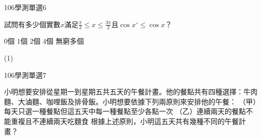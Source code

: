\begin{QUESTIONS}
\begin{QUESTION}
        \begin{QSOLLIST}
        \end{QSOLLIST}
        \begin{QEMPTYSPACE}
        \end{QEMPTYSPACE}
    \end{QUESTION}
    \begin{QUESTION}
        \begin{ExamInfo}{106}{學測}{單選}{6}
        \end{ExamInfo}
        \begin{ExamAnsRateInfo}{22}{43}{16}{7}
        \end{ExamAnsRateInfo}
        \begin{QBODY}
            試問有多少個實數$x$滿足$\frac{\pi }{2}\le x\le \frac{3\pi }{2}$且$\cos x{}^\circ \le \cos x$？
			\begin{QOPS}
				\QOP $0$個     
				\QOP $1$個     
				\QOP $2$個     
				\QOP $4$個     
				\QOP 無窮多個
			\end{QOPS}
        \end{QBODY}
        \begin{QFROMS}
        \end{QFROMS}
        \begin{QTAGS}\end{QTAGS}
        \begin{QANS}
            (1)
        \end{QANS}
        \begin{QSOLLIST}
        \end{QSOLLIST}
        \begin{QEMPTYSPACE}
        \end{QEMPTYSPACE}
    \end{QUESTION}
    \begin{QUESTION}
        \begin{ExamInfo}{106}{學測}{單選}{7}
        \end{ExamInfo}
        \begin{ExamAnsRateInfo}{29}{40}{27}{20}
        \end{ExamAnsRateInfo}
        \begin{QBODY}
            小明想要安排從星期一到星期五共五天的午餐計畫。他的餐點共有四種選擇：牛肉麵、大滷麵、咖哩飯及排骨飯。小明想要依據下列兩原則來安排他的午餐：
			（甲）每天只選一種餐點但這五天中每一種餐點至少各點一次
			（乙）連續兩天的餐點不能重複且不連續兩天吃麵食
			根據上述原則，小明這五天共有幾種不同的午餐計畫？

\end{QBODY}
\end{QUESTION}
\end{QUESTIONS}

